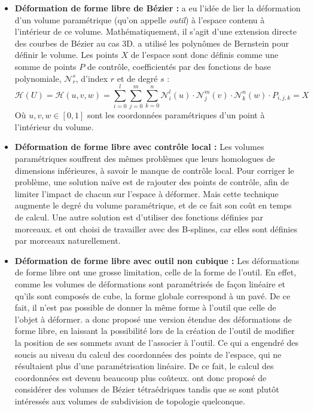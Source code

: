 \begin{itemize}
\item{\textbf{Déformation de forme libre de Bézier :}} \cite{SP86} a
  eu l'idée de lier la déformation d'un volume paramétrique (qu'on
  appelle \textit{outil}) à l'espace contenu à l'intérieur de ce
  volume. Mathématiquement, il s'agit d'une extension directe des
  courbes de Bézier au cas 3D. \cite{SP86} a utilisé les polynômes de
  Bernstein pour définir le volume. Les points $X$ de l'espace sont
  donc définis comme une somme de points $P$ de contrôle,
  coefficientés par des fonctions de base polynomiale,
  $\mathcal{N}_r^s$, d'index $r$ et de degré $s$ :
  \begin{equation}
    \mathcal{H}(U) = \mathcal{H}(u,v,w) = 
    \sum_{i=0}^l \sum_{j=0}^m \sum_{k=0}^n
    \mathcal{N}_i^l(u) \cdot \mathcal{N}_j^m(v) \cdot \mathcal{N}_k^n(w) \cdot P_{i,j,k} = X
  \end{equation}
  Où $u,v,w \in [0,1]$ sont les coordonnées paramétriques d'un point à
  l'intérieur du volume.
\item{\textbf{Déformation de forme libre avec contrôle local :}} Les
  volumes paramétriques souffrent des mêmes problèmes que leurs
  homologues de dimensions inférieures, à savoir le manque de contrôle
  local. Pour corriger le problème, une solution naïve est de rajouter
  des points de contrôle, afin de limiter l'impact de chacun sur
  l'espace à déformer. Mais cette technique augmente le degré du
  volume paramétrique, et de ce fait son coût en temps de calcul. Une
  autre solution est d'utiliser des fonctions définies par
  morceaux. \cite{GP89} et \cite{Com89} ont choisi de travailler avec
  des B-splines, car elles sont définies par morceaux naturellement.
\item{\textbf{Déformation de forme libre avec outil non cubique :}}
  Les déformations de forme libre ont une grosse limitation, celle de
  la forme de l'outil. En effet, comme les volumes de déformations
  sont paramétrisés de façon linéaire et qu'ils sont composés de cube,
  la forme globale correspond à un pavé. De ce fait, il n'est pas
  possible de donner la même forme à l'outil que celle de l'objet à
  déformer. \cite{Coq90} a donc proposé une version étendue des
  déformations de forme libre, en laissant la possibilité lors de la
  création de l'outil de modifier la position de ses sommets avant de
  l'associer à l'outil. Ce qui a engendré des soucis au niveau du
  calcul des coordonnées des points de l'espace, qui ne résultaient
  plus d'une paramétrisation linéaire. De ce fait, le calcul des
  coordonnées est devenu beaucoup plus coûteux. \cite{BBT97} ont donc
  proposé de considérer des volumes de Bézier tétraédriques tandis que
  \cite{MJ96} se sont plutôt intéressés aux volumes de subdivision de
  topologie quelconque.
\end{itemize}

